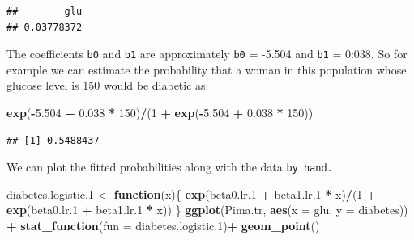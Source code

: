 \documentclass[]{article}
\newenvironment{Shaded}{\begin{snugshade}}{\end{snugshade}}
\newcommand{\KeywordTok}[1]{\textcolor[rgb]{0.13,0.29,0.53}{\textbf{#1}}}
\newcommand{\DataTypeTok}[1]{\textcolor[rgb]{0.13,0.29,0.53}{#1}}
\newcommand{\DecValTok}[1]{\textcolor[rgb]{0.00,0.00,0.81}{#1}}
\newcommand{\FloatTok}[1]{\textcolor[rgb]{0.00,0.00,0.81}{#1}}
\newcommand{\StringTok}[1]{\textcolor[rgb]{0.31,0.60,0.02}{#1}}
\newcommand{\ControlFlowTok}[1]{\textcolor[rgb]{0.13,0.29,0.53}{\textbf{#1}}}
\newcommand{\OperatorTok}[1]{\textcolor[rgb]{0.81,0.36,0.00}{\textbf{#1}}}
\newcommand{\NormalTok}[1]{#1}
\begin{document}
\begin{verbatim}
##        glu 
## 0.03778372
\end{verbatim}

The coefficients \texttt{b0} and \texttt{b1} are approximately
\texttt{b0} = -5.504 and \texttt{b1} = 0:038. So for example we can
estimate the probability that a woman in this population whose glucose
level is 150 would be diabetic as:

\begin{Shaded}
\begin{Highlighting}[]
\KeywordTok{exp}\NormalTok{(}\OperatorTok{-}\FloatTok{5.504} \OperatorTok{+}\StringTok{ }\FloatTok{0.038} \OperatorTok{*}\StringTok{ }\DecValTok{150}\NormalTok{)}\OperatorTok{/}\NormalTok{(}\DecValTok{1} \OperatorTok{+}\StringTok{ }\KeywordTok{exp}\NormalTok{(}\OperatorTok{-}\FloatTok{5.504} \OperatorTok{+}\StringTok{ }\FloatTok{0.038} \OperatorTok{*}\StringTok{ }\DecValTok{150}\NormalTok{))}
\end{Highlighting}
\end{Shaded}

\begin{verbatim}
## [1] 0.5488437
\end{verbatim}

We can plot the fitted probabilities along with the data
\texttt{by\ hand.}

\begin{Shaded}
\begin{Highlighting}[]
\NormalTok{diabetes.logistic.}\DecValTok{1}\NormalTok{ <-}\StringTok{ }\ControlFlowTok{function}\NormalTok{(x)\{}
    \KeywordTok{exp}\NormalTok{(beta0.lr.}\DecValTok{1} \OperatorTok{+}\StringTok{ }\NormalTok{beta1.lr.}\DecValTok{1} \OperatorTok{*}\StringTok{ }\NormalTok{x)}\OperatorTok{/}\NormalTok{(}\DecValTok{1} \OperatorTok{+}\StringTok{ }\KeywordTok{exp}\NormalTok{(beta0.lr.}\DecValTok{1} \OperatorTok{+}\StringTok{ }\NormalTok{beta1.lr.}\DecValTok{1} \OperatorTok{*}\StringTok{ }\NormalTok{x))}
\NormalTok{\}}
\KeywordTok{ggplot}\NormalTok{(Pima.tr, }\KeywordTok{aes}\NormalTok{(}\DataTypeTok{x =}\NormalTok{ glu, }\DataTypeTok{y =}\NormalTok{ diabetes)) }\OperatorTok{+}\StringTok{ }
\StringTok{    }\KeywordTok{stat_function}\NormalTok{(}\DataTypeTok{fun =}\NormalTok{ diabetes.logistic.}\DecValTok{1}\NormalTok{)}\OperatorTok{+}
\StringTok{    }\KeywordTok{geom_point}\NormalTok{()}
\end{Highlighting}
\end{Shaded}
\end{document}
